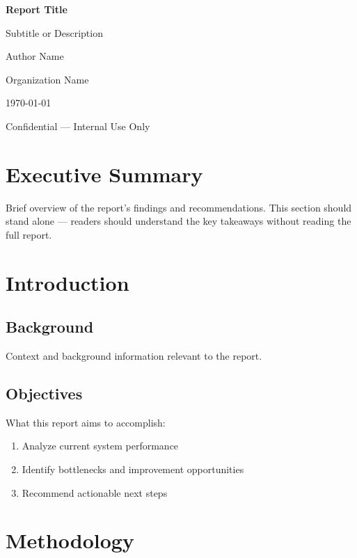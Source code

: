 \documentclass[12pt,a4paper]{article}
\begin{document}
\begin{titlepage}
\centering
\vspace*{2cm}
{\Huge\bfseries Report Title\par}
\vspace{1cm}
{\Large Subtitle or Description\par}
\vspace{2cm}
{\large Author Name\par}
{\large Organization Name\par}
\vspace{1cm}
{\large \today\par}
\vfill
{\small Confidential — Internal Use Only}
\end{titlepage}

\tableofcontents
\newpage

\section{Executive Summary}

Brief overview of the report's findings and recommendations. This section should stand alone — readers should understand the key takeaways without reading the full report.

\section{Introduction}

\subsection{Background}
Context and background information relevant to the report.

\subsection{Objectives}
What this report aims to accomplish:
\begin{enumerate}
  \item Analyze current system performance
  \item Identify bottlenecks and improvement opportunities
  \item Recommend actionable next steps
\end{enumerate}

\section{Methodology}
\end{document}
